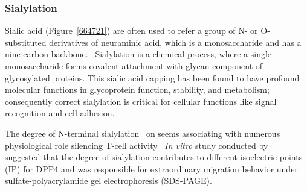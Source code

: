 \subsubsection {Sialylation}
Sialic acid (Figure~\ref{664721}) are often used to refer a group of N- or O-substituted derivatives of neuraminic acid, which is a monosaccharide and has a nine-carbon backbone.~\cite{Vocadlo_2009} Sialylation is a chemical process, where a single monosaccharide forms covalent attachment with glycan component of glycosylated proteins. This sialic acid capping has been found to have profound molecular functions in glycoprotein function, stability, and metabolism; consequently correct sialylation is critical for cellular functions like signal recognition and cell adhesion.~\cite{Bhide_2016}
\par 
The degree of N-terminal sialylation~\cite{Stehling_1999} on seems associating with numerous physiological role 
silencing T-cell activity~\cite{K_hne_1996} 
\textit{In vitro} study conducted by~\citet{Schmauser1999} suggested that the degree of sialylation contributes to different isoelectric points (IP) for DPP4 and was responsible for extraordinary migration behavior under sulfate-polyacrylamide gel electrophoresis (SDS-PAGE).